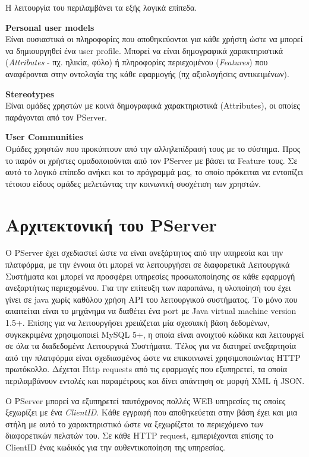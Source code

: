Η λειτουργία του περιλαμβάνει τα εξής λογικά επίπεδα. 
\begin{description}
\item \textbf{Personal user models}  \hfill \\
Είναι ουσιαστικά οι πληροφορίες που αποθηκεύονται για κάθε χρήστη ώστε να μπορεί να δημιουργηθεί 
ένα user profile. Μπορεί να είναι δημογραφικά χαρακτηριστικά (\emph{Attributes} - πχ. ηλικία, φύλο) ή πληροφορίες περιεχομένου
(\emph{Features}) που αναφέρονται στην οντολογία της κάθε εφαρμογής (πχ αξιολογήσεις αντικειμένων).
\item \textbf{Stereotypes}  \hfill \\
Είναι ομάδες χρηστών με κοινά δημογραφικά χαρακτηριστικά (Attributes), οι οποίες παράγονται από τον PServer. 
\item \textbf{User Communities}  \hfill \\
Ομάδες χρηστών που προκύπτουν από την αλληλεπίδρασή τους με το σύστημα. Προς το παρόν οι χρήστες ομαδοποιούνται από 
τον PServer με βάσει τα Feature τους.
Σε αυτό το λογικό επίπεδο ανήκει και το πρόγραμμά μας, το οποίο πρόκειται να εντοπίζει τέτοιου είδους
ομάδες μελετώντας την κοινωνική συσχέτιση των χρηστών.
\end{description} 
\cite{pServerUserGuide}

\section{Αρχιτεκτονική του PServer}
\noindent
Ο PServer έχει σχεδιαστεί ώστε να είναι ανεξάρτητος από την υπηρεσία και την πλατφόρμα, με την έννοια ότι
μπορεί να λειτουργήσει σε διαφορετικά Λειτουργικά Συστήματα και μπορεί να προσφέρει υπηρεσίες προσωποποίησης 
σε κάθε εφαρμογή ανεξαρτήτως περιεχομένου. Για την επίτευξη των παραπάνω, η υλοποίησή του έχει γίνει σε java
χωρίς καθόλου χρήση API του λειτουργικού συστήματος. Το μόνο που απαιτείται είναι το μηχάνημα να διαθέτει
ένα port με Java virtual machine version 1.5+. Επίσης για να λειτουργήσει χρειάζεται μία 
σχεσιακή βάση δεδομένων, συγκεκριμένα χρησιμοποιεί MySQL 5+, η οποία είναι ανοιχτού κώδικα και 
λειτουργεί σε όλα τα διαδεδομένα Λειτουργικά Συστήματα. Τέλος για να διατηρεί ανεξαρτησία από την 
πλατφόρμα είναι σχεδιασμένος ώστε να επικοινωνεί χρησιμοποιώντας HTTP πρωτόκολλο.
Δέχεται Http requests από τις εφαρμογές που εξυπηρετεί, τα οποία περιλαμβάνουν εντολές και παραμέτρους και δίνει απάντηση σε μορφή XML ή JSON.
\cite{pServerUserGuide}

Ο PServer μπορεί να εξυπηρετεί ταυτόχρονος πολλές WEB υπηρεσίες τις οποίες ξεχωρίζει με ένα \emph{ClientID}.
Κάθε εγγραφή που αποθηκεύεται στην βάση έχει και μια στήλη με αυτό το χαρακτηριστικό ώστε να ξεχωρίζεται το περιεχόμενο των διαφορετικών πελατών του.
Σε κάθε HTTP request, εμπεριέχονται επίσης το ClientID ένας κωδικός για την αυθεντικοποίηση της υπηρεσίας.


